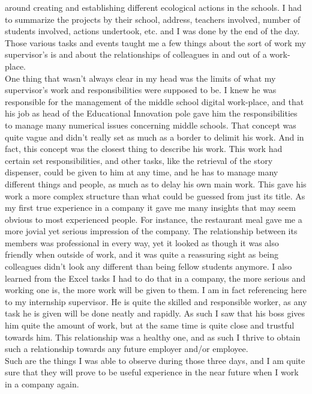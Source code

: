 \documentclass[12pt]{article}
\begin{document}
around creating and establishing different ecological actions in the schools. I had to summarize the projects by their school, address, teachers involved, number of students involved, actions undertook, etc. and I was done by the end of the day. \\
Those various tasks and events taught me a few things about the sort of work my supervisor's is and about the relationships of colleagues in and out of a work-place.\\
One thing that wasn't always clear in my head was the limits of what my supervisor's work and responsibilities were supposed to be. I knew he was responsible for the management of the middle school digital work-place, and that his job as head of the Educational Innovation pole gave him the responsibilities to manage many numerical issues concerning middle schools. That concept was quite vague and didn't really set as much as a border to delimit his work. And in fact, this concept was the closest thing to describe his work. This work had certain set responsibilities, and other tasks, like the retrieval of the story dispenser, could be given to him at any time, and he has to manage many different things and people, as much as to delay his own main work. This gave his work a more complex structure than what could be guessed from just its title. As my first true experience in a company it gave me many insights that may seem obvious to most experienced people. For instance, the restaurant meal gave me a more jovial yet serious impression of the company. The relationship between its members was professional in every way, yet it looked as though it was also friendly when outside of work, and it was quite a reassuring sight as being colleagues didn't look any different than being fellow students anymore. I also learned from the Excel tasks I had to do that in a company, the more serious and working one is, the more work will be given to them. I am in fact referencing here to my internship supervisor. He is quite the skilled and responsible worker, as any task he is given will be done neatly and rapidly. As such I saw that his boss gives him quite the amount of work, but at the same time is quite close and trustful towards him. This relationship was a healthy one, and as such I thrive to obtain such a relationship towards any future employer and/or employee. \\
Such are the things I was able to observe during those three days, and I am quite sure that they will prove to be useful experience in the near future when I work in a company again.
\end{document}
